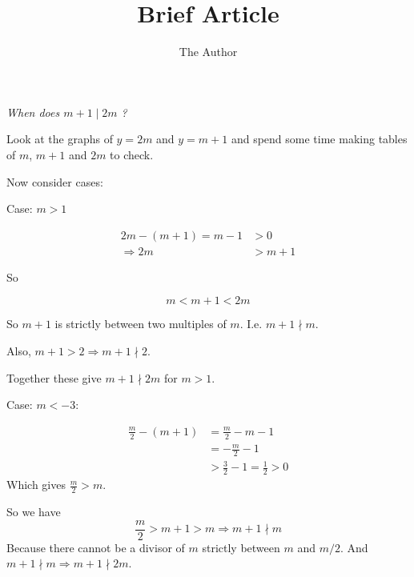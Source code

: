 \documentclass[11pt]{amsart}
\title{Brief Article}
\author{The Author}
\begin{document}

\emph{When does $m+1 \mid 2m$ ?}


Look at the graphs of $y = 2m$ and $ y = m+1$ and spend some time making tables of $m$, $m+1$ and $2m$ to check.

Now consider cases:

\vspace{1em}

Case: $m > 1$

\vspace{1em}

$$
\begin{aligned}
2m - (m+1) = m-1 &> 0
\\
\Rightarrow
2m &> m+1
\end{aligned}
$$

So

$$
m < m+1 < 2m
$$

So $m+1$ is strictly between two multiples of $m$. I.e. $m+1 \nmid m$.

Also, $m+1 > 2 \Rightarrow m+1 \nmid 2$.

Together these give $m+1 \nmid 2m$ for $m>1$.


\vspace{1em}

Case: $m < -3$:

\vspace{1em}

$$
\begin{aligned}
\frac{m}{2} - (m+1) 
&= \frac{m}{2} - m - 1
\\
&= 
- \frac{m}{2} - 1
\\
&> \frac{3}{2} - 1 = \frac{1}{2} > 0
\end{aligned}
$$
Which gives $\frac{m}{2} > m$.

So we have
$$
\frac{m}{2} > m+1 > m \Rightarrow m+1 \nmid m
$$ 
Because there cannot be a divisor of $m$ strictly between $m$ and $m/2$. And $m+1 \nmid m \Rightarrow m+1 \nmid 2m$.

\vspace{2em}
\end{document}
